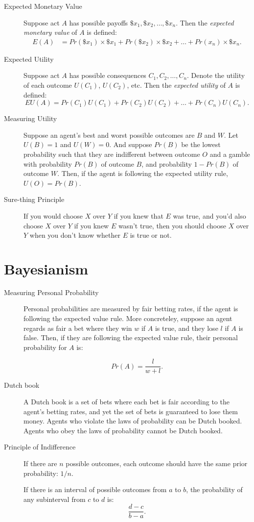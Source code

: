 \documentclass[justified]{tufte-book}
\renewcommand{\u}{U}
\newcommand{\p}{Pr}
\newcommand{\E}{E}
\newcommand{\EU}{EU}
\theoremstyle{definition}
\theoremstyle{definition}
\theoremstyle{definition}
\theoremstyle{remark}
\begin{document}
\begin{description}
\item[Expected Monetary Value]
Suppose act \(A\) has possible payoffs \(\$x_1, \$x_2, \ldots, \$x_n\).
Then the \emph{expected monetary value} of \(A\) is defined: \[
  \begin{aligned}
\E(A) &= \p(\$x_1) \times \$x_1 + \p(\$x_2) \times \$x_2 + \ldots + \p(x_n) \times \$x_n.
  \end{aligned}
\]
\item[Expected Utility]
Suppose act \(A\) has possible consequences \(C_1, C_2, \ldots,C_n\).
Denote the utility of each outcome \(U(C_1)\), \(U(C_2)\), etc. Then the
\emph{expected utility} of \(A\) is defined:
\[ \EU(A) = \p(C_1)\u(C_1) + \p(C_2)\u(C_2) + \ldots + \p(C_n)\u(C_n). \]
\item[Measuring Utility]
Suppose an agent's best and worst possible outcomes are \(B\) and \(W\).
Let \(\u(B) = 1\) and \(\u(W) = 0\). And suppose \(\p(B)\) be the lowest
probability such that they are indifferent between outcome \(O\) and a
gamble with probability \(\p(B)\) of outcome \(B\), and probability
\(1 - \p(B)\) of outcome \(W\). Then, if the agent is following the
expected utility rule, \(\u(O) = \p(B)\).
\item[Sure-thing Principle]
If you would choose \(X\) over \(Y\) if you knew that \(E\) was true,
and you'd also choose \(X\) over \(Y\) if you knew \(E\) wasn't true,
then you should choose \(X\) over \(Y\) when you don't know whether
\(E\) is true or not.
\end{description}

\hypertarget{bayesianism-1}{%
\section*{Bayesianism}\label{bayesianism-1}}

\begin{description}
\item[Measuring Personal Probability]
Personal probabilities are measured by fair betting rates, if the agent
is following the expected value rule. More concreteley, suppose an agent
regards as fair a bet where they win \(w\) if \(A\) is true, and they
lose \(l\) if \(A\) is false. Then, if they are following the expected
value rule, their personal probability for \(A\) is:

\[ \p(A) = \frac{l}{w + l}. \]
\item[Dutch book]
A Dutch book is a set of bets where each bet is fair according to the
agent's betting rates, and yet the set of bets is guaranteed to lose
them money. Agents who violate the laws of probability can be Dutch
booked. Agents who obey the laws of probability cannot be Dutch booked.
\item[Principle of Indifference]
If there are \(n\) possible outcomes, each outcome should have the same
prior probability: \(1/n\).

If there is an interval of possible outcomes from \(a\) to \(b\), the
probability of any subinterval from \(c\) to \(d\) is:
\[\frac{d-c}{b-a}.\]
\end{description}
\end{document}
